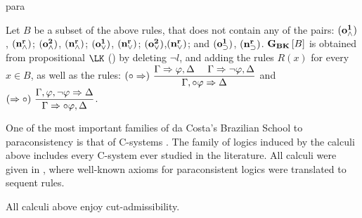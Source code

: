 \begin{entry}{para}
 \begin{clarifications}
Let $B$ be a subset of the above rules, that does not contain any of the
 pairs:
${\bf (o^1_\wedge)}$, ${\bf (n^r_\wedge)}$;
${\bf (o^2_\wedge)}$, ${\bf (n^r_\wedge)}$;
${\bf (o^1_\vee)}$, ${\bf (n^r_\vee)}$;
${\bf (o^2_\vee)}$,${\bf (n^r_\vee)}$; and
${\bf (o^1_\supset)}$, ${\bf (n^r_\supset)}$.
${{\bf G}_{\bf BK}}\left[B\right]$ is obtained from  propositional
 $\LK$ () by deleting
$\neg l$,
 and
 adding the rules $R(x)$ for every $x\in B$, as well as the rules:
\footnotesize$
(\circ\Rightarrow)~\dfrac{\Gamma\Rightarrow\varphi,\Delta~~~~ \Gamma\Rightarrow\neg\varphi,\Delta}{\Gamma,\circ\varphi\Rightarrow\Delta} $
\normalsize and \footnotesize
$(\Rightarrow\circ)~\dfrac{\Gamma,\varphi,\neg\varphi\Rightarrow\Delta}{\Gamma\Rightarrow\circ\varphi,\Delta}
$.
 \end{clarifications}

 \begin{history}
One of the most important families of da Costa's Brazilian School
to paraconsistency is that of
C-systems \cite{car:jmar:Taxonomy}.
The family of logics induced by the calculi above includes
every C-system ever studied in the literature.
All calculi were given in \cite{Avron2015},
where well-known axioms for paraconsistent logics were translated to sequent rules.
 \end{history}

 \begin{technicalities}
All calculi above enjoy cut-admissibility.
 \end{technicalities}



%
%
%
%
%
%
%
%




\end{entry}
